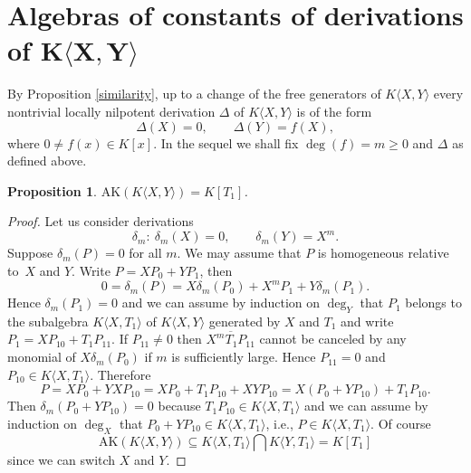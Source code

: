\documentclass[10pt,a4paper]{amsart}
\numberwithin{equation}{section}
\newtheorem{Proposition}[Theorem]{Proposition}
\begin{document}
\section[Algebras of constants of derivations of $K\langle X,Y\rangle$]{Algebras of constants of derivations of $\boldsymbol{K\langle X,Y\rangle}$}

By Proposition \ref{similarity}, up to a change of the free generators of $K\langle X,Y\rangle$ every nontrivial locally nilpotent derivation $\Delta$ of $K\langle X,Y\rangle$ is of the form
\[
\Delta(X)=0,\qquad \Delta(Y)=f(X),
\]
where $0\not=f(x)\in K[x]$. In the sequel we shall fix $\deg(f)=m\geq 0$ and $\Delta$ as defined above.

\begin{Proposition}\label{AK is generated by commutator}
$\text{AK}(K\langle X,Y\rangle) = K[T_1]$.
\end{Proposition}
\begin{proof}
Let us consider derivations
\[
\delta_m\colon \ \delta_m(X) = 0, \qquad\delta_m(Y) = X^m.
\]
Suppose $\delta_m(P) = 0$ for all $m$. We may assume that $P$ is homogeneous relative to~$X$ and $Y$. Write $P = XP_0 + YP_1$, then
\[
0 = \delta_m(P) = X\delta_m(P_0) + X^mP_1+ Y\delta_m(P_1).
\]
Hence $\delta_m(P_1) = 0$ and we can assume by induction on $\deg_Y$ that $P_1$ belongs to the subalgebra $K\langle X, T_1\rangle$ of $K\langle X,Y\rangle$ generated by $X$ and $T_1$ and write $P_1 = XP_{10} + T_1P_{11}$. If $P_{11} \neq 0$ then $\overline{X^mT_1P_{11}}$ cannot be canceled by any monomial of $X\delta_m(P_0)$ if $m$ is sufficiently large. Hence $P_{11} = 0$ and $P_{10} \in K\langle X, T_1\rangle$. Therefore
\[
P = XP_0 + YXP_{10} =XP_0 + T_1P_{10} + XYP_{10} = X(P_0 + YP_{10}) + T_1P_{10}.
\]
Then $\delta_m(P_0 +YP_{10}) = 0$ because $T_1P_{10} \in K\langle X,T_1\rangle$ and we can assume by induction on $\deg_X$ that $P_0 + YP_{10} \in K\langle X, T_1\rangle$, i.e., $P \in K\langle X, T_1\rangle$. Of course
\[
\text{AK}(K\langle X,Y\rangle) \subseteq K\langle X, T_1\rangle\bigcap K\langle Y, T_1\rangle= K[T_1]
\]
since we can switch $X$ and $Y$.
\end{proof}
\end{document}
